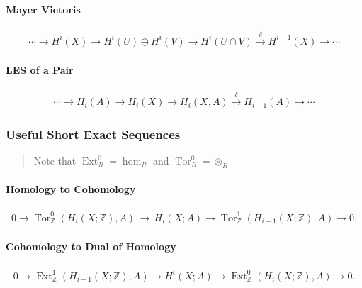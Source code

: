 \hypertarget{mayer-vietoris-1}{%
\paragraph{Mayer Vietoris}\label{mayer-vietoris-1}}

\begin{align*}
\cdots \to H^{i}(X)\to H^{i}(U)\oplus H^{i}(V)\to H^{i}(U\cap V)\xrightarrow{\delta} H^{i+1}(X)\to \cdots
\end{align*}

\hypertarget{les-of-a-pair}{%
\paragraph{LES of a Pair}\label{les-of-a-pair}}

\begin{align*}
\cdots \to H_{i}(A)\to H_{i}(X)\to H_{i}(X,A){\stackrel{\delta }{\to }}H_{{i-1}}(A)\to \cdots
\end{align*}

\hypertarget{useful-short-exact-sequences}{%
\subsubsection{Useful Short Exact
Sequences}\label{useful-short-exact-sequences}}

\begin{quote}
Note that \(\operatorname{Ext}_R^0 = \hom_R\) and
\(\operatorname{Tor}_R^0 = \otimes_R\)
\end{quote}

\hypertarget{homology-to-cohomology}{%
\paragraph{Homology to Cohomology}\label{homology-to-cohomology}}

\begin{align*}
\displaystyle 0\to \operatorname{Tor}_{\mathbb{Z}}^0 (H_{i}(X;{\mathbb{Z}}), A)\,{\to }\,H_{i}(X;A)\to \operatorname {Tor}_{\mathbb{Z}}^1 (H_{i-1}(X;{\mathbb{Z}}),A)\to 0
.\end{align*}

\hypertarget{cohomology-to-dual-of-homology}{%
\paragraph{Cohomology to Dual of
Homology}\label{cohomology-to-dual-of-homology}}

\begin{align*}
0\to \operatorname{Ext}_{{\mathbb{Z}}}^{1}(H_{i-1}(X; {\mathbb{Z}}),A)\to H^{i}(X; A)\to \operatorname{Ext}_{{\mathbb{Z}}}^{0}(H_{i}(X; {\mathbb{Z}}),A) \to 0
.\end{align*}

